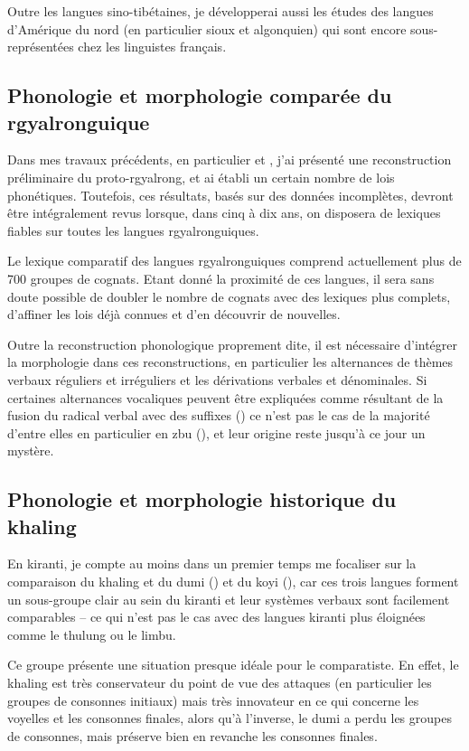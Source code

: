 \documentclass[oldfontcommands,oneside,a4paper,11pt]{article}
\begin{document}
Outre les langues sino-tibétaines, je développerai aussi les études des langues d'Amérique du nord (en particulier sioux et algonquien) qui sont encore sous-représentées chez les linguistes français.
 

\subsection{Phonologie et morphologie comparée du rgyalronguique} \label{sec:comparee.rgy}
Dans mes travaux précédents, en particulier \citet{jacques04these} et \citet{jacques14esquisse}, j'ai présenté une reconstruction préliminaire du proto-rgyalrong, et ai établi un certain nombre de lois phonétiques. Toutefois, ces résultats, basés sur des données incomplètes, devront être intégralement revus lorsque, dans cinq à dix ans, on disposera de lexiques fiables sur toutes les langues rgyalronguiques.

Le lexique comparatif des langues rgyalronguiques comprend actuellement plus de 700 groupes de cognats. Etant donné la proximité de ces langues, il sera sans doute possible de doubler le nombre de cognats avec des lexiques plus complets,  d'affiner les lois déjà connues et d'en découvrir de nouvelles. 

Outre la reconstruction phonologique proprement dite, il est nécessaire d'intégrer la morphologie dans ces reconstructions, en particulier les alternances de thèmes verbaux réguliers et irréguliers et les dérivations verbales et dénominales. Si certaines alternances vocaliques peuvent être expliquées comme résultant de la fusion du radical verbal avec des suffixes (\citealt[357-8]{jacques04these}) ce n'est pas le cas de la majorité d'entre elles en particulier en zbu (\citealt{jackson04showu}), et leur origine reste jusqu'à ce jour un mystère.

\subsection{Phonologie et morphologie historique du khaling}
En kiranti, je compte au moins dans un premier temps me focaliser sur la comparaison du khaling et du dumi (\citealt{driem93dumi}) et du koyi (\citealt{lahaussois09}), car ces trois langues forment un sous-groupe clair au sein du kiranti et leur systèmes verbaux sont facilement comparables -- ce qui n'est pas le cas avec des langues kiranti plus éloignées comme le thulung ou le limbu.

Ce groupe présente une situation presque idéale pour le comparatiste. En effet, le khaling est très conservateur du point de vue des attaques (en particulier les groupes de consonnes initiaux) mais très innovateur en ce qui concerne les voyelles et les consonnes finales, alors qu'à l'inverse, le dumi a perdu les groupes de consonnes, mais préserve bien en revanche les consonnes finales. 
\end{document}
